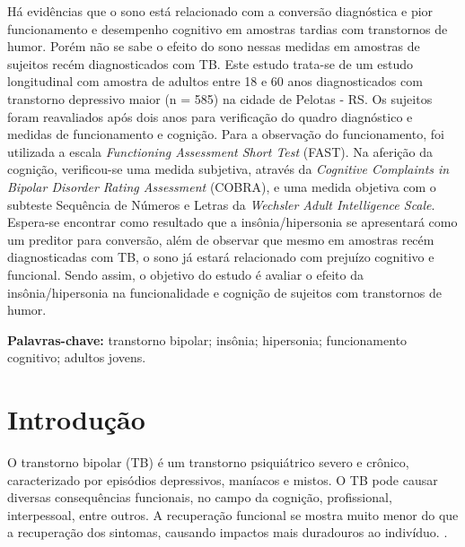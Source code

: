\documentclass[chapter=TITLE,
               oneside,
               12pt,
               a4paper,
               english,
               brazil]{abntex2}    %
\begin{document}
\begin{resumo}

    Há evidências que o sono está relacionado com a conversão diagnóstica
    e pior funcionamento e desempenho cognitivo em amostras tardias com
    transtornos de humor.
    Porém não se sabe o efeito do sono nessas medidas em amostras de sujeitos
    recém diagnosticados com TB.
    Este estudo trata-se de um estudo longitudinal com amostra de adultos entre
    18 e 60 anos diagnosticados com transtorno depressivo maior (n = 585) na
    cidade de Pelotas - RS. Os sujeitos foram reavaliados após dois anos para
    verificação do quadro diagnóstico e medidas de funcionamento e cognição.
    Para a observação do funcionamento, foi utilizada a escala
    \textit{Functioning Assessment Short Test} (FAST). Na aferição da cognição,
    verificou-se uma medida subjetiva, através da
    \textit{Cognitive Complaints in Bipolar Disorder Rating Assessment} (COBRA),
    e uma medida objetiva com o subteste Sequência de Números e Letras da
    \textit{Wechsler Adult Intelligence Scale}.
    Espera-se encontrar como resultado que a insônia/hipersonia se apresentará
    como um preditor para conversão, além de observar que mesmo em amostras
    recém diagnosticadas com TB, o sono já estará relacionado com prejuízo
    cognitivo e funcional.
    Sendo assim, o objetivo do estudo é avaliar o efeito da
    insônia/hipersonia na funcionalidade e cognição de sujeitos com
    transtornos de humor.

    \vspace{\onelineskip}

    \textbf{Palavras-chave:} transtorno bipolar; insônia; hipersonia;
    funcionamento cognitivo; adultos jovens.

\end{resumo}

\textual

\begingroup
\renewcommand{\cleardoublepage}{}
\renewcommand{\clearpage}{}

\chapter{Introdução}\label{sec:introducao}
    
    O transtorno bipolar (TB) é um transtorno psiquiátrico severo e crônico,
    caracterizado por episódios depressivos, maníacos e mistos.
    O TB pode causar diversas consequências funcionais, no campo da cognição,
    profissional, interpessoal, entre outros.
    A recuperação funcional se mostra muito menor do que a recuperação dos
    sintomas, causando impactos mais duradouros ao indivíduo.
    \parencite{american_psychiatric_association_diagnostic_2013}.
    
\end{document}
